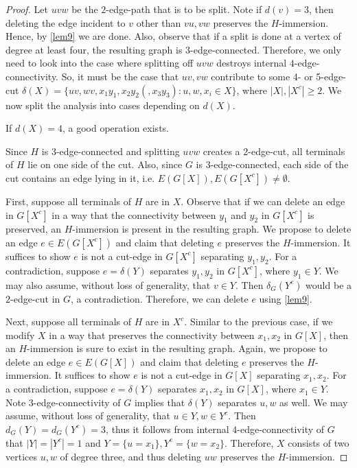 \documentclass[10pt,a4paper]{amsart}
\begin{document}
\begin{proof}
Let $uvw$ be the $2$-edge-path that is to be split. Note if $d(v)=3$, then deleting the edge incident to $v$ other than $vu,vw$ preserves the $H$-immersion. Hence, by \cref{lem9} we are done. Also, observe that if a split is done at a vertex of degree at least four, the resulting graph is $3$-edge-connected. Therefore, we only need to look into the case where splitting off $uvw$ destroys internal $4$-edge-connectivity. So, it must be the case that $uv, vw$ contribute to some 4- or 5-edge-cut $\delta (X)=\{ uv, wv, x_1y_1, x_2y_2 (, x_3y_3): u, w, x_i \in X \}$, where $|X|,|X^c|\ge 2$. We now split the analysis into cases depending on $d(X)$.
\begin{claim}
\label{splitdX4}
If $d(X)=4$, a good operation exists.
\end{claim}
Since $H$ is $3$-edge-connected and splitting $uvw$ creates a 2-edge-cut, all terminals of $H$ lie on one side of the cut. Also, since $G$ is $3$-edge-connected, each side of the cut contains an edge lying in it, i.e. $E(G[X]), E(G[X^c])\neq \emptyset$.

First, suppose all terminals of $H$ are in $X$. Observe that if we can delete an edge in $G[X^c]$ in a way that  the connectivity between $y_1$ and $y_2$ in $G[X^c]$ is preserved, an $H$-immersion is present in the resulting graph. We propose to delete an edge $e \in E(G[X^c])$ and claim that deleting $e$ preserves the $H$-immersion. It suffices to show $e$ is not a cut-edge in $G[X^c]$ separating $y_1, y_2$. For a contradiction, suppose $e=\delta(Y)$ separates $y_1,y_2$ in $G[X^c]$, where $y_1\in Y$. We may also assume, without loss of generality, that $v \in Y$. Then $\delta_G(Y^c)$ would be a $2$-edge-cut in $G$, a contradiction. Therefore, we can delete $e$ using \cref{lem9}.

Next, suppose all terminals of $H$ are in $X^c$. Similar to the previous case, if we modify $X$ in a way that preserves the connectivity between $x_1, x_2$ in $G[X]$, then an $H$-immersion is sure to exist in the resulting graph. Again, we propose to delete an edge $e \in E(G[X])$ and claim that deleting $e$ preserves the $H$-immersion. It suffices to show $e$ is not a cut-edge in $G[X]$ separating $x_1, x_2$. For a contradiction, suppose $e=\delta(Y)$ separates $x_1,x_2$ in $G[X]$, where $x_1\in Y$. Note $3$-edge-connectivity of $G$ implies that $\delta(Y)$ separates $u, w$ as well. We may assume, without loss of generality, that $u\in Y, w\in Y^c$. Then $d_G(Y)=d_G(Y^c)=3$, thus it follows from internal $4$-edge-connectivity of $G$ that $|Y|=|Y^c|=1$ and $Y=\{u=x_1\}, Y^c=\{w=x_2\}$. Therefore, $X$ consists of two vertices $u,w$ of degree three, and thus deleting $uw$ preserves the $H$-immersion.


\end{proof}
\end{document}
